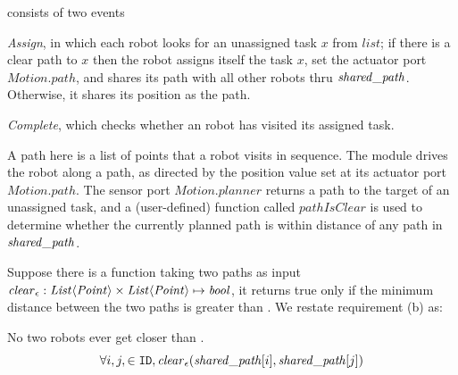 \Task consists of two events
\begin{inparaenum}[(1)]
    \item \emph{Assign}, in which each robot looks for an unassigned task $x$ from $\mathit{list}$;
    if there is a clear path to $x$ then the robot assigns itself the task $x$,
    set the actuator port $\mathit{Motion.path}$,
    and shares its path with all other robots thru $\mathit{shared\_path}$.
    Otherwise, it shares its position as the path.
    \item \emph{Complete}, which checks whether an robot has visited its assigned task.
\end{inparaenum}
A path here is a list of points that a robot visits in sequence.
The \Motion module drives the robot along a path,
as directed by the position value set at its actuator port $\mathit{Motion.path}$.
The sensor port $\mathit{Motion.planner}$ returns a path to the target of an unassigned task,
and a (user-defined) function called $\mathit{pathIsClear}$ is used to determine
whether the currently planned path is within \ds distance of any path in $\mathit{shared\_path}$.

\newcommand{\dist}{\mathit{clear}_\ds}
\newcommand{\pathIsClear}{\mathit{pathIsClear}}
\newcommand{\PATHISCLEAR}{\mathit{PIC}}

Suppose there is a function taking two paths as input
$\dist : \mathit{List}\langle \mathit{Point}\rangle \times \mathit{List}\langle \mathit{Point}\rangle \mapsto \mathit{bool}$,
it returns true only if the minimum distance between the two paths is greater than \ds.
We restate requirement (b) as:
\begin{invariant}
\label{inv:task}
No two robots ever get closer than \ds.
\[
    \forall i,j, \in \UINS, \dist(\pathvar[i], \pathvar[j])
\]
\end{invariant}
\noindent

